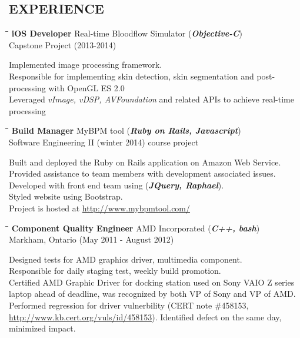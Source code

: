 \documentclass{res}
\begin{document}
\begin{resume}
\section{EXPERIENCE}
   \vspace{-0.1in}
   \begin{tabbing}%
   \hspace{2.3in}\= \hspace{2.6in}\= \kill %
   {\bf iOS Developer}  \>Real-time Bloodflow Simulator (\textbf{\textit{Objective-C}})\>\\
                          \>Capstone Project (2013-2014)
   \end{tabbing}\vspace{-20pt}
    Implemented image processing framework.\\
    Responsible for implementing skin detection, skin segmentation and post-processing with OpenGL ES 2.0\\
    Leveraged \textit{vImage, vDSP, AVFoundation} and related APIs to achieve real-time processing
   \begin{tabbing}
   \hspace{2.3in}\= \hspace{2.6in}\= \kill %
    {\bf Build Manager} \>MyBPM tool (\textbf{\textit{Ruby on Rails, Javascript}})\>\\
                          \>Software Engineering II (winter 2014) course project
   \end{tabbing}\vspace{-20pt}
    Built and deployed the Ruby on Rails application on Amazon Web Service.\\
    Provided assistance to team members with development associated issues.\\
    Developed with front end team using (\textbf{\textit{JQuery, Raphael}}).\\
    Styled website using Bootstrap.\\Project is hosted at \url{http://www.mybpmtool.com/}
   \begin{tabbing}
   \hspace{2.3in}\= \hspace{2.6in}\= \kill %
   {\bf Component Quality Engineer} \>AMD Incorporated (\textbf{\textit{C++, bash}})\>\\
                             \>Markham, Ontario (May 2011 - August 2012)
   \end{tabbing}\vspace{-20pt}      %
    Designed tests for AMD graphics driver, multimedia component.\\Responsible
    for daily staging test, weekly build promotion.\\
    Certified AMD Graphic Driver for docking station used on Sony VAIO Z series laptop
    ahead of deadline, was recognized by both VP of Sony and VP of AMD.\\
    Performed regression for driver vulnerbility (CERT note \#458153,
    \url{http://www.kb.cert.org/vuls/id/458153}). Identified defect on
    the same day, minimized impact.


\end{resume}
\end{document}
